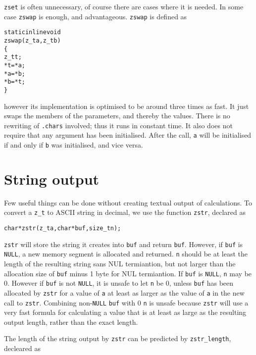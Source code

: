 {\tt zset} is often unnecessary, of course
there are cases where it is needed. In some case
{\tt zswap} is enough, and advantageous.
{\tt zswap} is defined as

\begin{alltt}
   \textcolor{c}{static inline} void
   zswap(z_t a, z_t b)
   \{
       z_t t;
       *t = *a;
       *a = *b;
       *b = *t;
   \}
\end{alltt}

\noindent
however its implementation is optimised to be
around three times as fast. It just swaps the members
of the parameters, and thereby the values. There
is no rewriting of {\tt .chars} involved; thus
it runs in constant time. It also does not
require that any argument has been initialised.
After the call, {\tt a} will be initialised
if and only if {\tt b} was initialised, and
vice versa.


\newpage
\section{String output}
\label{sec:String output}

Few useful things can be done without creating
textual output of calculations. To convert a
{\tt z\_t} to ASCII string in decimal, we use the
function {\tt zstr}, declared as

\begin{alltt}
   char *zstr(z_t a, char *buf, size_t n);
\end{alltt}

\noindent
{\tt zstr} will store the string it creates into
{\tt buf} and return {\tt buf}. However, if {\tt buf}
is {\tt NULL}, a new memory segment is allocated
and returned. {\tt n} should be at least the length
of the resulting string sans NUL termiantion, but
not larger than the allocation size of {\tt buf}
minus 1 byte for NUL termiantion. If {\tt buf} is
{\tt NULL}, {\tt n} may be 0. However if {\tt buf}
is not {\tt NULL}, it is unsafe to let {\tt n} be
0, unless {\tt buf} has been allocated by {\tt zstr}
for a value of {\tt a} at least as larger as the
value of {\tt a} in the new call to {\tt zstr}.
Combining non-\texttt{NULL} {\tt buf} with 0 {\tt n}
is unsafe because {\tt zstr} will use a very fast
formula for calculating a value that is at least
as large as the resulting output length, rather
than the exact length.

The length of the string output by {\tt zstr} can
be predicted by {\tt zstr\_length}, decleared as

